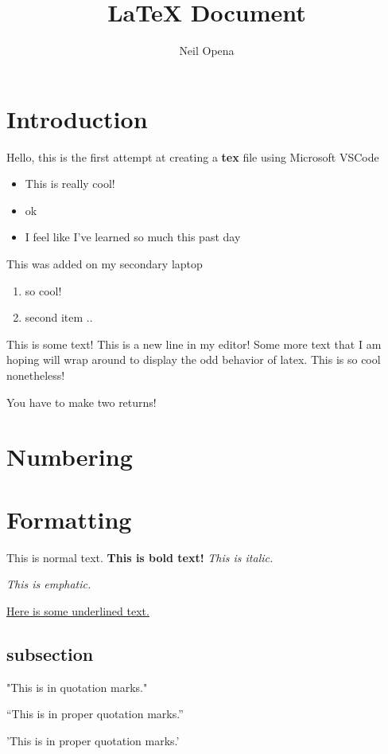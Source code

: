 \documentclass[10pt]{article}
\author{Neil Opena}
\title{{\LaTeX} Document}
\begin{document}
    \maketitle

    \section{Introduction}

    Hello, this is the first attempt at creating a \textbf{tex} file using Microsoft VSCode
    \begin{itemize}
        \item This is really cool!
        \item ok
        \item I feel like I've learned so much this past day
    \end{itemize}
    This was added on my secondary laptop
    \begin{enumerate}
        \item so cool!
        \item second item ..
    \end{enumerate}

    This is some text!
    This is a new line in my editor!
    Some more text that I am hoping will wrap around to display the odd behavior of latex. This is so cool nonetheless!

    You have to make two returns!

    \section{Numbering}

    \section{Formatting}

    This is normal text.
    \textbf{This is bold text!}
    \textit{This is italic.}

    \emph{This is emphatic.}

    \underline{Here is some underlined text.}

    \subsection{subsection}

    "This is in quotation marks."

    ``This is in proper quotation marks.''

    'This is in proper quotation marks.'
\end{document}
